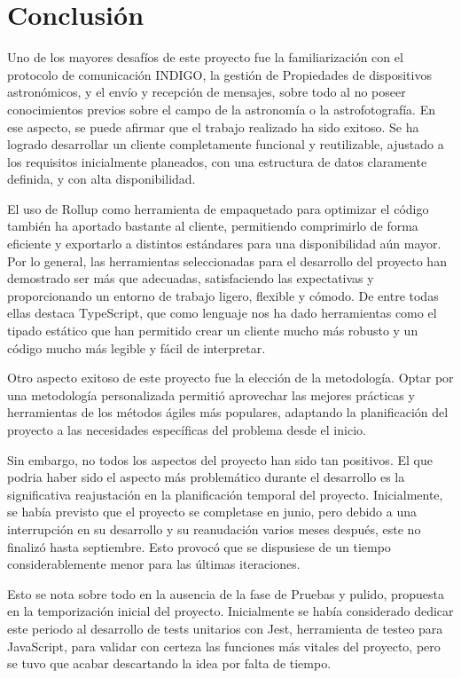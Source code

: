 \section{Conclusión}

Uno de los mayores desafíos de este proyecto fue la familiarización con el protocolo de comunicación INDIGO, la gestión de Propiedades de dispositivos astronómicos, y el envío y recepción de mensajes, sobre todo al no poseer conocimientos previos sobre el campo de la astronomía o la astrofotografía. En ese aspecto, se puede afirmar que el trabajo realizado ha sido exitoso. Se ha logrado desarrollar un cliente completamente funcional y reutilizable, ajustado a los requisitos inicialmente planeados, con una estructura de datos claramente definida, y con alta disponibilidad. 

El uso de Rollup como herramienta de empaquetado para optimizar el código también ha aportado bastante al cliente, permitiendo comprimirlo de forma eficiente y exportarlo a distintos estándares para una disponibilidad aún mayor. Por lo general, las herramientas seleccionadas para el desarrollo del proyecto han demostrado ser más que adecuadas, satisfaciendo las expectativas y proporcionando un entorno de trabajo ligero, flexible y cómodo. De entre todas ellas destaca TypeScript, que como lenguaje nos ha dado herramientas como el tipado estático que han permitido crear un cliente mucho más robusto y un código mucho más legible y fácil de interpretar.

Otro aspecto exitoso de este proyecto fue la elección de la metodología. Optar por una metodología personalizada permitió aprovechar las mejores prácticas y herramientas de los métodos ágiles más populares, adaptando la planificación del proyecto a las necesidades específicas del problema desde el inicio.


Sin embargo, no todos los aspectos del proyecto han sido tan positivos. 
El que podria haber sido el aspecto más problemático durante el desarrollo es la significativa reajustación en la planificación temporal del proyecto. Inicialmente, se había previsto que el proyecto se completase en junio, pero debido a una interrupción en su desarrollo y su reanudación varios meses después, este no finalizó hasta septiembre. Esto provocó que se dispusiese de un tiempo considerablemente menor para las últimas iteraciones.

Esto se nota sobre todo en la ausencia de la fase de Pruebas y pulido, propuesta en la temporización inicial del proyecto. Inicialmente se había considerado dedicar este periodo al desarrollo de tests unitarios con Jest, herramienta de testeo para JavaScript, para validar con certeza las funciones más vitales del proyecto, pero se tuvo que acabar descartando la idea por falta de tiempo.

